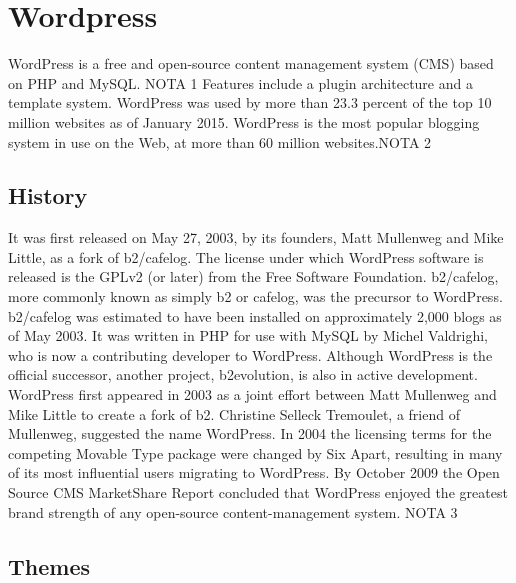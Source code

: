 \section{Wordpress}
\label{sec:CMS_wp}

WordPress is a free and open-source content management system (CMS) based on PHP and MySQL. NOTA 1 Features include a plugin architecture and a template system. WordPress was used by more than 23.3 percent of the top 10 million websites as of January 2015. WordPress is the most popular blogging system in use on the Web, at more than 60 million websites.NOTA 2


\subsection{History}
\label{subsec:wp_his}
It was first released on May 27, 2003, by its founders, Matt Mullenweg and Mike Little, as a fork of b2/cafelog. The license under which WordPress software is released is the GPLv2 (or later) from the Free Software Foundation.
b2/cafelog, more commonly known as simply b2 or cafelog, was the precursor to WordPress. b2/cafelog was estimated to have been installed on approximately 2,000 blogs as of May 2003. It was written in PHP for use with MySQL by Michel Valdrighi, who is now a contributing developer to WordPress. Although WordPress is the official successor, another project, b2evolution, is also in active development.
WordPress first appeared in 2003 as a joint effort between Matt Mullenweg and Mike Little to create a fork of b2. Christine Selleck Tremoulet, a friend of Mullenweg, suggested the name WordPress.
In 2004 the licensing terms for the competing Movable Type package were changed by Six Apart, resulting in many of its most influential users migrating to WordPress. By October 2009 the Open Source CMS MarketShare Report concluded that WordPress enjoyed the greatest brand strength of any open-source content-management system. NOTA 3



\subsection{Themes}
\label{subsec:wp_themes}


